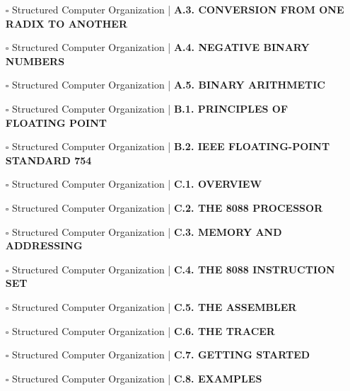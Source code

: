 \documentclass[a4, landscape, 12pt]{article}
\newcommand{\checkbox}{$\square$}%
\begin{document}
\begin{itemize}
{}
\item [\checkbox]  Structured Computer Organization | \textbf{ A.3. CONVERSION FROM ONE RADIX TO ANOTHER
}
\item [\checkbox]  Structured Computer Organization | \textbf{ A.4. NEGATIVE BINARY NUMBERS
}
\item [\checkbox]  Structured Computer Organization | \textbf{ A.5. BINARY ARITHMETIC
}
\item [\checkbox]  Structured Computer Organization | \textbf{ B.1. PRINCIPLES OF FLOATING POINT
}
\item [\checkbox]  Structured Computer Organization | \textbf{ B.2. IEEE FLOATING-POINT STANDARD 754
}
\item [\checkbox]  Structured Computer Organization | \textbf{ C.1. OVERVIEW
}
\item [\checkbox]  Structured Computer Organization | \textbf{ C.2. THE 8088 PROCESSOR
}
\item [\checkbox]  Structured Computer Organization | \textbf{ C.3. MEMORY AND ADDRESSING
}
\item [\checkbox]  Structured Computer Organization | \textbf{ C.4. THE 8088 INSTRUCTION SET
}
\item [\checkbox]  Structured Computer Organization | \textbf{ C.5. THE ASSEMBLER
}
\item [\checkbox]  Structured Computer Organization | \textbf{ C.6. THE TRACER
}
\item [\checkbox]  Structured Computer Organization | \textbf{ C.7. GETTING STARTED
}
\item [\checkbox]  Structured Computer Organization | \textbf{ C.8. EXAMPLES
}
\end{itemize}
\end{document}
